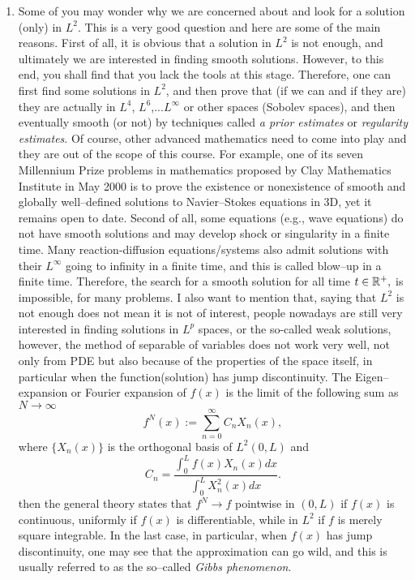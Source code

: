 \documentclass[6pt]{article}
\numberwithin{equation}{section}
\def\mathbb{\Bbb}
\begin{document}
\begin{enumerate}
\item Some of you may wonder why we are concerned about and look for a solution (only) in $L^2$.  This is a very good question and here are some of the main reasons.  First of all, it is obvious that a solution in $L^2$ is not enough, and ultimately we are interested in finding smooth solutions.  However, to this end, you shall find that you lack the tools at this stage.  Therefore, one can first find some solutions in $L^2$, and then prove that (if we can and if they are) they are actually in $L^4$, $L^6$,...$L^\infty$ or other spaces (Sobolev spaces), and then eventually smooth (or not) by techniques called \emph{a prior estimates} or \emph{regularity estimates}.  Of course, other advanced mathematics need to come into play and they are out of the scope of this course.  For example, one of its seven Millennium Prize problems in mathematics proposed by Clay Mathematics Institute in May 2000 is to prove the existence or nonexistence of smooth and globally well--defined solutions to Navier--Stokes equations in 3D, yet it remains open to date.  Second of all, some equations (e.g., wave equations) do not have smooth solutions and may develop shock or singularity in a finite time.  Many reaction-diffusion equations/systems also admit solutions with their $L^\infty$ going to infinity in a finite time, and this is called blow--up in a finite time.  Therefore, the search for a smooth solution for all time $t\in\mathbb R^+,$ is impossible, for many problems.  I also want to mention that, saying that $L^2$ is not enough does not mean it is not of interest, people nowadays are still very interested in finding solutions in $L^p$ spaces, or the so-called weak solutions, however, the method of separable of variables does not work very well, not only from PDE but also because of the properties of the space itself, in particular when the function(solution) has jump discontinuity.   The Eigen--expansion or Fourier expansion of $f(x)$ is the limit of the following sum as $N\rightarrow \infty$
    \[f^N(x):=\sum_{n=0}^\infty C_n X_n(x),\]
    where $\{X_n(x)\}$ is the orthogonal basis of $L^2(0,L)$ and
    \[C_n=\frac{\int_0^L f(x)X_n(x)dx}{\int_0^L X_n^2(x) dx}.\]
  then the general theory states that $f^N\rightarrow f$ pointwise in $(0,L)$ if $f(x)$ is continuous, uniformly if $f(x)$ is differentiable, while in $L^2$ if $f$ is merely square integrable.  In the last case, in particular, when $f(x)$ has jump discontinuity, one may see that the approximation can go wild, and this is usually referred to as the so--called \emph{Gibbs phenomenon}.


\end{enumerate}
\end{document}
